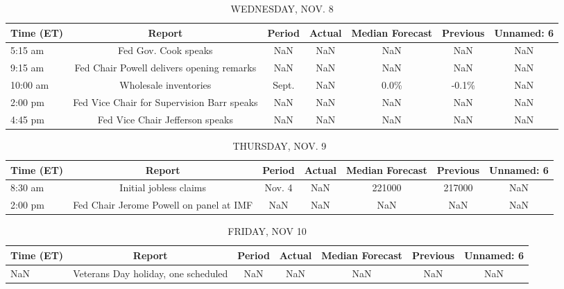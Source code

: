 \documentclass{article}%
\begin{document}
\begin{table}[htbp]%
\caption{WEDNESDAY, NOV. 8}%
\centering%
\begin{adjustbox}{width=1\textwidth}%
\begin{tabular}{lcccccc}
\toprule
Time (ET) &                                     Report & Period & Actual & Median Forecast & Previous & Unnamed: 6 \\
\midrule
  5:15 am &                       Fed Gov. Cook speaks &    NaN &    NaN &             NaN &      NaN &        NaN \\
  9:15 am &  Fed Chair Powell delivers opening remarks &    NaN &    NaN &             NaN &      NaN &        NaN \\
 10:00 am &                      Wholesale inventories &  Sept. &    NaN &            0.0\% &    -0.1\% &        NaN \\
  2:00 pm & Fed Vice Chair for Supervision Barr speaks &    NaN &    NaN &             NaN &      NaN &        NaN \\
  4:45 pm &            Fed Vice Chair Jefferson speaks &    NaN &    NaN &             NaN &      NaN &        NaN \\
\bottomrule
\end{tabular}
%
\end{adjustbox}%
\end{table}

%


\begin{table}[htbp]%
\caption{THURSDAY, NOV. 9}%
\centering%
\begin{adjustbox}{width=1\textwidth}%
\begin{tabular}{lcccccc}
\toprule
Time (ET) &                                  Report & Period & Actual & Median Forecast & Previous & Unnamed: 6 \\
\midrule
  8:30 am &                  Initial jobless claims & Nov. 4 &    NaN &          221000 &   217000 &        NaN \\
  2:00 pm & Fed Chair Jerome Powell on panel at IMF &    NaN &    NaN &             NaN &      NaN &        NaN \\
\bottomrule
\end{tabular}
%
\end{adjustbox}%
\end{table}

%


\begin{table}[htbp]%
\caption{FRIDAY, NOV 10}%
\centering%
\begin{adjustbox}{width=1\textwidth}%
\begin{tabular}{lcccccc}
\toprule
Time (ET) &                              Report & Period & Actual & Median Forecast & Previous & Unnamed: 6 \\
\midrule
      NaN & Veterans Day holiday, one scheduled &    NaN &    NaN &             NaN &      NaN &        NaN \\
\bottomrule
\end{tabular}
%
\end{adjustbox}%
\end{table}
\end{document}
